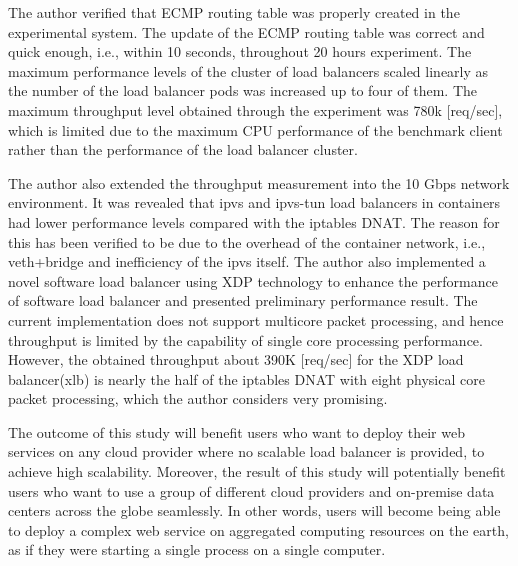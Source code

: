%
The author verified that ECMP routing table was properly created in the experimental system.
The update of the ECMP routing table was correct and quick enough, i.e., within 10 seconds, throughout 20 hours experiment.
The maximum performance levels of the cluster of load balancers scaled linearly as the number of the load balancer pods was increased up to four of them.
The maximum throughput level obtained through the experiment was 780k [req/sec], which is limited due to the maximum CPU performance of the benchmark client rather than the performance of the load balancer cluster.

The author also extended the throughput measurement into the 10 Gbps network environment.
It was revealed that ipvs and ipvs-tun load balancers in containers had lower performance levels compared with the iptables DNAT.
The reason for this has been verified to be due to the overhead of the container network, i.e., veth+bridge and inefficiency of the ipvs itself.
The author also implemented a novel software load balancer using XDP technology to enhance the performance of software load balancer and presented preliminary performance result.
The current implementation does not support multicore packet processing, and hence throughput is limited by the capability of single core processing performance.
However, the obtained throughput about 390K [req/sec] for the XDP load balancer(xlb) is nearly the half of the iptables DNAT with eight physical core packet processing, which the author considers very promising.
 
The outcome of this study will benefit users who want to deploy their web services on any cloud provider where no scalable load balancer is provided, to achieve high scalability.
Moreover, the result of this study will potentially benefit users who want to use a group of different cloud providers and on-premise data centers across the globe seamlessly.
In other words, users will become being able to deploy a complex web service on aggregated computing resources on the earth, as if they were starting a single process on a single computer.



 
